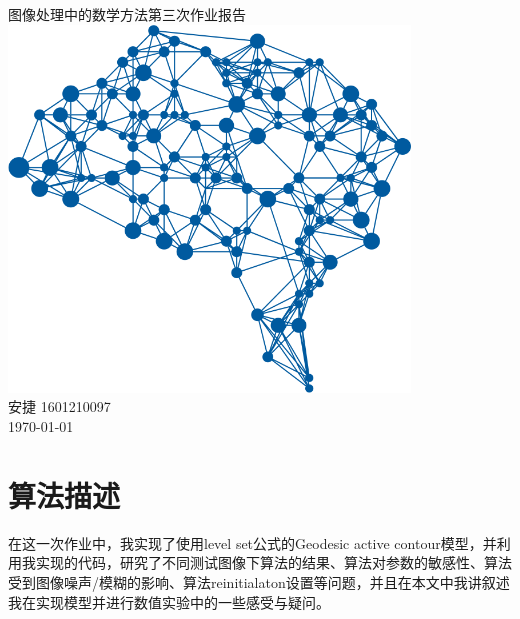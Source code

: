 \documentclass[a4paper, UTF8]{ctexrep}
\begin{document}
	\begin{titlepage}
		\centering
		\vspace{6cm}
		\LARGE{图像处理中的数学方法第三次作业报告}\\
		\vspace{3cm}
		\includegraphics[width=0.8\textwidth]{deepLearning.png}\\
		\vspace{4cm}
		\normalsize{安捷 1601210097}\\
		\normalsize{\today}
	\end{titlepage}
	\section{算法描述}
		在这一次作业中，我实现了使用level set公式的Geodesic active contour模型，并利用我实现的代码，研究了不同测试图像下算法的结果、算法对参数的敏感性、算法受到图像噪声/模糊的影响、算法reinitialaton设置等问题，并且在本文中我讲叙述我在实现模型并进行数值实验中的一些感受与疑问。
\end{document}

